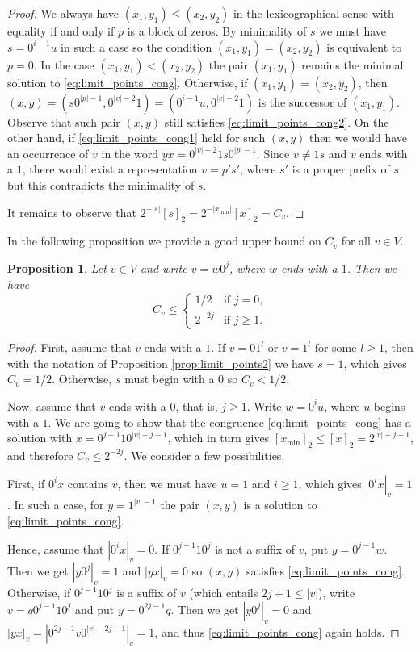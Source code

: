 \documentclass[a4paper,11pt]{amsart}
\newtheorem{prop}[thm]{Proposition}
\theoremstyle{definition}
\begin{document}
\begin{proof}
We always have $(x_1, y_1) \leq (x_2, y_2)$ in the lexicographical sense with equality if and only if $p$ is a block of zeros. By minimality of $s$ we must have  $s = 0^{i-1} u$ in such a case so the condition $(x_1,y_1) = (x_2,y_2)$ is equivalent to $p = 0$.
In the case $(x_1, y_1) < (x_2 , y_2)$  the pair $(x_1,y_1)$ remains the minimal solution to \eqref{eq:limit_points_cong}. Otherwise, if $(x_1, y_1) = (x_2 , y_2)$, then $(x,y)=(s0^{|p|-1},0^{|v|-2} 1) = (0^{i-1}u,0^{|v|-2} 1)$ is the successor of $(x_1,y_1)$. Observe that such pair $(x,y)$ still satisfies \eqref{eq:limit_points_cong2}. On the other hand, if \eqref{eq:limit_points_cong1} held for such $(x,y)$ then we would have an occurrence of $v$ in the word $yx = 0^{|v|-2} 1 s 0^{|p|-1}$. Since $v \neq 1 s$ and $v$ ends with a $1$, there would exist a representation $v = p's'$, where $s'$ is a proper prefix of $s$ but this contradicts the minimality of $s$. 

It remains to observe that $2^{-|s|}[s]_2 = 2^{-|x_{\min}|} [x]_2 = C_v$.
\end{proof}

In the following proposition we provide a good upper bound on $C_v$ for all $v \in V$.

\begin{prop} \label{prop:Cv_inequality}
Let $v \in V$ and write $v = w0^j$, where $w$ ends with a $1$. Then we have
$$C_v \leq \begin{cases} 
 1/2 &\text{if } j=0, \\
2^{-2j} &\text{if } j \geq 1.
\end{cases}
$$
\end{prop}
\begin{proof}
First, assume that $v$ ends with a $1$. If $v = 01^l$ or $v=1^l$ for some $l \geq 1$, then with the notation of Proposition \ref{prop:limit_points2} we have $s=1$, which gives $C_v = 1/2$. Otherwise, $s$ must begin with a $0$ so $C_v < 1/2$.

Now, assume that $v$ ends with a $0$, that is, $j \geq 1$. Write $w = 0^i u$, where $u$ begins with a $1$. We are going to show that the congruence \eqref{eq:limit_points_cong} has a solution with $x = 0^{j-1} 1  0^{|v|-j-1}$, which in turn gives $[x_{\min}]_2 \leq [x]_2 = 2^{|v|-j-1}$, and therefore $C_v \leq  2^{-2j}$. We consider a few possibilities.  

First, if $0^ix$ contains $v$, then we must have $u=1$ and $i \geq 1$, which gives $|0^ix|_v=1$. In such a case, for $y=1^{|v|-1}$ the pair $(x,y)$ is a solution to \eqref{eq:limit_points_cong}. 

Hence, assume that $|0^ix|_v = 0$. If $0^{j-1} 1 0^j$  is not a suffix of $v$, put $y= 0^{j-1}w$. Then we get $|y0^j|_v = 1$ and $|yx|_v = 0$ so $(x,y)$ satisfies \eqref{eq:limit_points_cong}. Otherwise, if $0^{j-1} 1 0^j$  is a suffix of $v$ (which entails $2j+1 \leq |v|$), write $v =  q 0^{j-1} 1 0^j$ and put $y = 0^{2j-1}q$. Then we get $|y0^j|_v = 0$ and $|yx|_v = |0^{2j-1} v 0^{|v|-2j-1} |_v = 1$, and thus \eqref{eq:limit_points_cong} again holds.
\end{proof}
\end{document}
